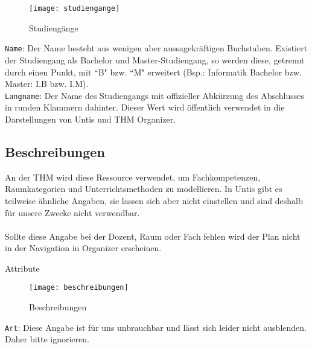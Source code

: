 \newpage

\begin{wrapfigure}{r}{0.4\textwidth}
	\centering
	\vspace{-4pt}
	\texttt{[image: studiengange]}
	\vspace{-5pt}
	\caption{Studiengänge}
	\label{fig:studiengange}
\end{wrapfigure}

\noindent
\texttt{Name}: Der Name besteht aus wenigen aber aussagekräftigen Buchstaben. Existiert der Studiengang als Bachelor und Master-Studiengang, so werden diese, getrennt durch einen Punkt, mit ``B" \hspace{1pt} bzw. ``M" \hspace{1pt} erweitert (Bsp.: Informatik Bachelor bzw. Master:  I.B bzw. I.M).\\

\noindent
\texttt{Langname}: Der Name des Studiengangs mit offizieller Abkürzung des Abschlusses in runden Klammern dahinter. Dieser Wert wird öffentlich verwendet in die Darstellungen von Untis und THM Organizer.

\subsection{Beschreibungen}

An der THM wird diese Ressource verwendet, um Fachkompetenzen, Raumkategorien und Unterrichtsmethoden zu modellieren. In Untis gibt es teilweise ähnliche Angaben, sie lassen sich aber nicht einstellen und sind deshalb für unsere Zwecke nicht verwendbar.\\
\\
Sollte diese Angabe bei der Dozent, Raum oder Fach fehlen wird der Plan nicht in der Navigation in Organizer erscheinen.\\

\noindent
{\large Attribute\par}
\vspace{8pt}

\begin{wrapfigure}{r}{0.4\textwidth}
	\centering
	\vspace{-14pt}
	\texttt{[image: beschreibungen]}
	\vspace{-15pt}
	\caption{Beschreibungen}
	\label{fig:beschreibungen}
	\vspace{-35pt}
\end{wrapfigure}

\noindent
\texttt{Art}: Diese Angabe ist für uns unbrauchbar und lässt sich leider nicht ausblenden. Daher bitte ignorieren.\\


